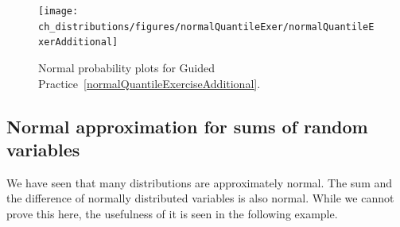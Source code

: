 \begin{figure}
\centering
\texttt{[image: ch\_distributions/figures/normalQuantileExer/normalQuantileExerAdditional]}
\caption{Normal probability plots for Guided Practice~\ref{normalQuantileExerciseAdditional}.}
\label{normalQuantileExerAdditional}
\end{figure}


\subsection{Normal approximation for sums of random variables}
\label{normapproxsumrv}

We have seen that many distributions are approximately normal. The sum and the difference of normally distributed variables is also normal. While we cannot prove this here, the usefulness of it is seen in the following example.

